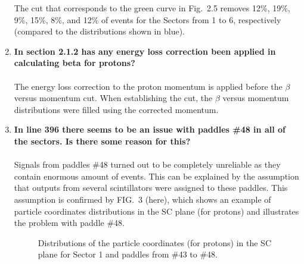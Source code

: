 \documentclass[,superscriptaddress,showpacs,amssymb,amsmath,amsfonts,linenumbers,article]{revtex4-1}
\begin{document}
\begin{enumerate}[label=\textbf{\arabic*}.]
The cut that corresponds to the green curve in Fig.~2.5 removes 12\%, 19\%, 9\%, 15\%, 8\%, and 12\% of events for the Sectors from 1 to 6, respectively (compared to the distributions shown in blue).


\item {\bf In section 2.1.2 has any energy loss correction been applied in calculating beta for protons?}\\ \\
The energy loss correction to the proton momentum is applied before the $\beta$ versus momentum cut. When establishing the cut, the $\beta$ versus momentum distributions were filled using the corrected momentum.

\item {\bf In line 396 there seems to be an issue with paddles \#48 in all of the sectors. Is there some reason for this?}\\ \\
Signals from paddles \#48 turned out to be completely unreliable as they contain enormous amount of events. This can be explained by the assumption that outputs from several scintillators were assigned to these paddles. This assumption is confirmed by FIG.~3 (here), which shows an example of particle coordinates distributions in the SC plane (for protons) and illustrates the problem with paddle \#48.


\begin{figure}[htp]
\begin{center}
\caption{\small Distributions of the particle coordinates (for protons) in the SC plane for Sector 1 and paddles from \#43 to \#48.}  \label{fig:cc_plane_def}
\end{center}
\end{figure}



\end{enumerate}
\end{document}
